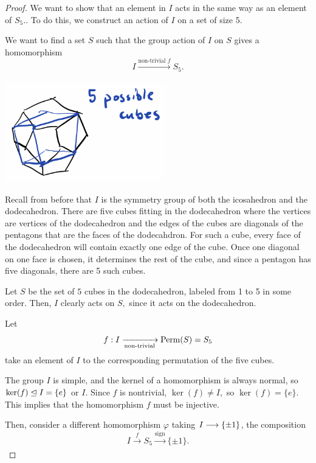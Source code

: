 \begin{proof}
We want to show that an element in $I$ acts in the same way as an element of $S_5.$. To do this, we construct an action of $I$ on a set of size 5. 

We want to find a set $S$ such that the group action of $I$ on $S$ gives a homomorphism
\[I \xrightarrow[]{\text{non-trivial } f} S_5.\]

\begin{center}
    \includegraphics[width=7cm]{Lecture Files and Images/lec20-dodec.png}
\end{center}

Recall from before that $I$ is the symmetry group of both the icosahedron and the dodecahedron. There are five cubes fitting in the dodecahedron where the vertices are vertices of the dodecahedron and the edges of the cubes are diagonals of the pentagons that are the faces of the dodecahdron. For such a cube, every face of the dodecahedron will contain exactly one edge of the cube. Once one diagonal on one face is chosen, it determines the rest of the cube, and since a pentagon has five diagonals, there are 5 such cubes. 

Let $S$ be the set of $5$ cubes in the dodecahedron, labeled from 1 to 5 in some order. Then, $I$ clearly acts on $S,$ since it acts on the dodecahedron. 

Let 
\[
f: I \xrightarrow[\text{non-trivial}]{} \operatorname{Perm}(S) = S_5
\]
take an element of $I$ to the corresponding permutation of the five cubes.

The group $I$ is simple, and the kernel of a homomorphism is always normal, so $\ker(f) \trianglelefteq I = \{e\}$ or $I.$ Since $f$ is nontrivial, $\ker(f) \neq I,$ so $\ker(f) = \{e\}.$ This implies that the homomorphism $f$ must be injective. 

Then, consider a different homomorphism $\varphi$ taking $I \longrightarrow \{\pm 1\}$, the composition
\[
I \xrightarrow[]{f} S_5 \xrightarrow[]{\text{sign}} \{\pm 1\}.
\]


\end{proof}
